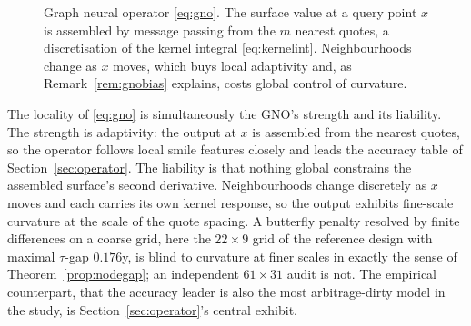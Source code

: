 \begin{figure}[htbp]\centering
{}
\caption{Graph neural operator \eqref{eq:gno}. The surface value at a query point $x$ is
assembled by message passing from the $m$ nearest quotes, a discretisation of the kernel
integral \eqref{eq:kernelint}. Neighbourhoods change as $x$ moves, which buys local adaptivity
and, as Remark~\ref{rem:gnobias} explains, costs global control of curvature.}\label{fig:gno}
\end{figure}

\begin{remark}\label{rem:gnobias}
The locality of \eqref{eq:gno} is simultaneously the GNO's strength and its liability. The
strength is adaptivity: the output at $x$ is assembled from the nearest quotes, so the operator
follows local smile features closely and leads the accuracy table of Section~\ref{sec:operator}.
The liability is that nothing global constrains the assembled surface's second derivative.
Neighbourhoods change discretely as $x$ moves and each carries its own kernel response, so the
output exhibits fine-scale curvature at the scale of the quote spacing. A butterfly penalty
resolved by finite differences on a coarse grid, here the $22\times9$ grid of the reference
design with maximal $\tau$-gap $0.176$y, is blind to curvature at finer scales in exactly the
sense of Theorem~\ref{prop:nodegap}; an independent $61\times31$ audit is not. The empirical
counterpart, that the accuracy leader is also the most arbitrage-dirty model in the study, is
Section~\ref{sec:operator}'s central exhibit.
\end{remark}

